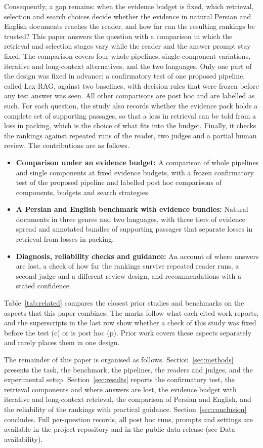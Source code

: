 Consequently, a gap remains: when the evidence budget is fixed, which retrieval, selection and search choices decide whether the evidence in natural Persian and English documents reaches the reader, and how far can the resulting rankings be trusted? This paper answers the question with a comparison in which the retrieval and selection stages vary while the reader and the answer prompt stay fixed. The comparison covers four whole pipelines, single-component variations, iterative and long-context alternatives, and the two languages. Only one part of the design was fixed in advance: a confirmatory test of one proposed pipeline, called Lex-RAG, against two baselines, with decision rules that were frozen before any test answer was seen. All other comparisons are post hoc and are labelled as such. For each question, the study also records whether the evidence pack holds a complete set of supporting passages, so that a loss in retrieval can be told from a loss in packing, which is the choice of what fits into the budget. Finally, it checks the rankings against repeated runs of the reader, two judges and a partial human review. The contributions are as follows.
\begin{itemize}
\item \textbf{Comparison under an evidence budget:} A comparison of whole pipelines and single components at fixed evidence budgets, with a frozen confirmatory test of the proposed pipeline and labelled post hoc comparisons of components, budgets and search strategies.
\item \textbf{A Persian and English benchmark with evidence bundles:} Natural documents in three genres and two languages, with three tiers of evidence spread and annotated bundles of supporting passages that separate losses in retrieval from losses in packing.
\item \textbf{Diagnosis, reliability checks and guidance:} An account of where answers are lost, a check of how far the rankings survive repeated reader runs, a second judge and a different review design, and recommendations with a stated confidence.
\end{itemize}

Table~\ref{tab:related} compares the closest prior studies and benchmarks on the aspects that this paper combines. The marks follow what each cited work reports, and the superscripts in the last row show whether a check of this study was fixed before the test (c) or is post hoc (p). Prior work covers these aspects separately and rarely places them in one design.


The remainder of this paper is organised as follows. Section~\ref{sec:methods} presents the task, the benchmark, the pipelines, the readers and judges, and the experimental setup. Section~\ref{sec:results} reports the confirmatory test, the retrieval components and where answers are lost, the evidence budget with iterative and long-context retrieval, the comparison of Persian and English, and the reliability of the rankings with practical guidance. Section~\ref{sec:conclusion} concludes. Full per-question records, all post hoc runs, prompts and settings are available in the project repository and in the public data release (see Data availability).
